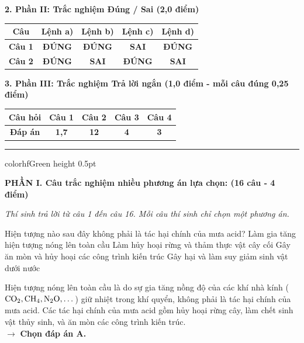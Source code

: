 \documentclass[11pt,a4paper]{article}
\begin{document}
\vspace{2pt}
\noindent
\textbf{\color{mainGreen}2. Phần II: Trắc nghiệm Đúng / Sai (2,0 điểm)}
\begin{center}
\renewcommand{\arraystretch}{1.2}
\begin{tabular}{|c|c|c|c|c|}
\hline
\rowcolor{tableGreen}
\textbf{Câu} & \textbf{Lệnh a)} & \textbf{Lệnh b)} & \textbf{Lệnh c)} & \textbf{Lệnh d)} \\
\hline
\textbf{Câu 1} & \textbf{\color{hfRed}ĐÚNG} & \textbf{\color{hfRed}ĐÚNG} & \textbf{\color{solBlue}SAI} & \textbf{\color{hfRed}ĐÚNG} \\
\hline
\textbf{Câu 2} & \textbf{\color{hfRed}ĐÚNG} & \textbf{\color{solBlue}SAI} & \textbf{\color{hfRed}ĐÚNG} & \textbf{\color{solBlue}SAI} \\
\hline
\end{tabular}
\end{center}

\vspace{2pt}
\noindent
\textbf{\color{mainGreen}3. Phần III: Trắc nghiệm Trả lời ngắn (1,0 điểm - mỗi câu đúng 0,25 điểm)}
\begin{center}
\renewcommand{\arraystretch}{1.2}
\begin{tabular}{|c|c|c|c|c|}
\hline
\rowcolor{tableGreen}
\textbf{Câu hỏi} & \textbf{Câu 1} & \textbf{Câu 2} & \textbf{Câu 3} & \textbf{Câu 4} \\
\hline
\textbf{Đáp án} & \textbf{\color{hfRed}1,7} & \textbf{\color{hfRed}12} & \textbf{\color{hfRed}4} & \textbf{\color{hfRed}3} \\
\hline
\end{tabular}
\end{center}

\vspace{4pt}
\hrule color{hfGreen} height 0.5pt

\vspace{4pt}
\noindent
\textbf{\large\color{mainGreen}PHẦN I. Câu trắc nghiệm nhiều phương án lựa chọn: (16 câu - 4 điểm)}

\textit{Thí sinh trả lời từ câu 1 đến câu 16. Mỗi câu thí sinh chỉ chọn một phương án.}
\vspace{4pt}

\begin{ex}%
Hiện tượng nào sau đây không phải là tác hại chính của mưa acid?
\choice
{\True Làm gia tăng hiện tượng nóng lên toàn cầu}
{Làm hủy hoại rừng và thảm thực vật cây cối}
{Gây ăn mòn và hủy hoại các công trình kiến trúc}
{Gây hại và làm suy giảm sinh vật dưới nước}
\begin{loigiai}
Hiện tượng nóng lên toàn cầu là do sự gia tăng nồng độ của các khí nhà kính ($\ce{CO2}, \ce{CH4}, \ce{N2O},\dots$) giữ nhiệt trong khí quyển, không phải là tác hại chính của mưa acid. Các tác hại chính của mưa acid gồm hủy hoại rừng cây, làm chết sinh vật thủy sinh, và ăn mòn các công trình kiến trúc.\\
$\rightarrow$ \textbf{Chọn đáp án A.}
\end{loigiai}
\end{ex}
\end{document}
